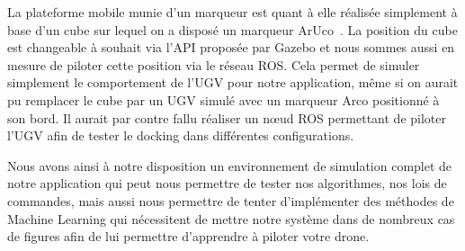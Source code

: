 La plateforme mobile munie d’un marqueur est quant à elle réalisée simplement à base d’un cube sur lequel on a disposé un marqueur ArUco~\cite{kurosu2018human,campilho2018image}. La position du cube est changeable à souhait via l’API proposée par Gazebo et nous sommes aussi en mesure de piloter cette position via le réseau ROS. Cela permet de simuler simplement le comportement de l’UGV pour notre application, même si on aurait pu remplacer le cube par un UGV simulé avec un marqueur Arco positionné à son bord. Il aurait par contre fallu réaliser un nœud ROS permettant de piloter l’UGV afin de tester le docking dans différentes configurations.

Nous avons ainsi à notre disposition un environnement de simulation complet de notre application qui peut nous permettre de tester nos algorithmes, nos lois de commandes, mais aussi nous permettre de tenter d’implémenter des méthodes de Machine Learning qui nécessitent de mettre notre système dans de nombreux cas de figures afin de lui permettre d’apprendre à piloter votre drone.
